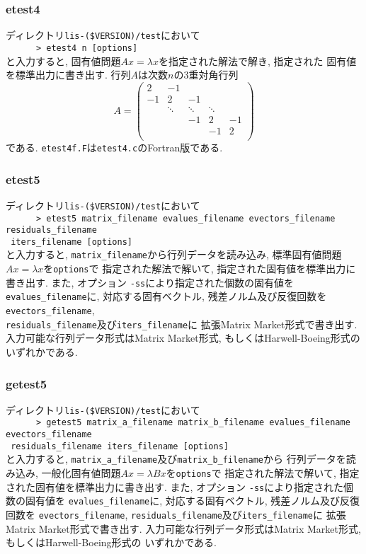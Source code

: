 \documentclass[a4paper]{jarticle}
\begin{document}
{{\subsubsection{etest4}
ディレクトリ{\tt lis-(\$VERSION)/test}において\\
 \verb+      > etest4 n [options]+\\
と入力すると, 固有値問題$Ax=\lambda x$を指定された解法で解き, 指定された
固有値を標準出力に書き出す. 
行列$A$は次数$n$の3重対角行列
\[
A = 
\left(
\begin{array}{ccccc}
2 & -1 &   &  &   \\
-1 & 2 & -1 &  &   \\
  & \ddots  & \ddots  & \ddots  &   \\
  &   & -1 & 2 & -1 \\
  &   &   & -1 & 2 \\
\end{array}
\right)
\]
である. 
{\tt etest4f.F}は{\tt etest4.c}のFortran版である. 

\subsubsection{etest5}
ディレクトリ{\tt lis-(\$VERSION)/test}において\\
 \verb+      > etest5 matrix_filename evalues_filename evectors_filename residuals_filename +\\
\verb+ iters_filename [options] +\\
と入力すると, {\tt matrix\_filename}から行列データを読み込み, 
標準固有値問題$Ax=\lambda x$を{\tt options}で
指定された解法で解いて, 指定された固有値を標準出力に書き出す. 
また, オプション {\tt -ss}により指定された個数の固有値を
{\tt evalues\_filename}に, 対応する固有ベクトル, 残差ノルム及び反復回数を
{\tt evectors\_filename}, \\
{\tt residuals\_filename}及び{\tt iters\_filename}に
拡張Matrix Market形式で書き出す.
入力可能な行列データ形式はMatrix Market形式, もしくはHarwell-Boeing形式の
いずれかである. 

\subsubsection{getest5}
ディレクトリ{\tt lis-(\$VERSION)/test}において\\
 \verb+      > getest5 matrix_a_filename matrix_b_filename evalues_filename evectors_filename +\\
\verb+ residuals_filename iters_filename [options] +\\
と入力すると, {\tt matrix\_a\_filename}及び{\tt matrix\_b\_filename}から
行列データを読み込み, 一般化固有値問題$Ax=\lambda Bx$を{\tt options}で
指定された解法で解いて, 指定された固有値を標準出力に書き出す. 
また, オプション {\tt -ss}により指定された個数の固有値を
{\tt evalues\_filename}に, 対応する固有ベクトル, 残差ノルム及び反復回数を
{\tt evectors\_filename}, {\tt residuals\_filename}及び{\tt iters\_filename}に
拡張Matrix Market形式で書き出す. 
入力可能な行列データ形式はMatrix Market形式, もしくはHarwell-Boeing形式の
いずれかである. 

}}
\end{document}
